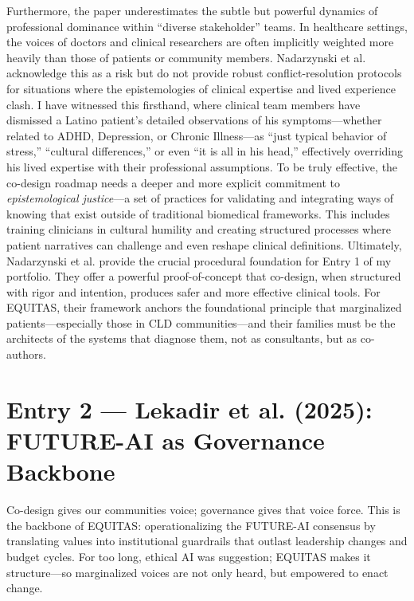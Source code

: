 \documentclass[11pt,twoside]{article}
\begin{document}
Furthermore, the paper underestimates the subtle but powerful dynamics of professional dominance within “diverse stakeholder” teams. In healthcare settings, the voices of doctors and clinical researchers are often implicitly weighted more heavily than those of patients or community members. Nadarzynski et al. acknowledge this as a risk but do not provide robust conflict-resolution protocols for situations where the epistemologies of clinical expertise and lived experience clash. I have witnessed this firsthand, where clinical team members have dismissed a Latino patient's detailed observations of his symptoms—whether related to ADHD, Depression, or Chronic Illness—as “just typical behavior of stress,” “cultural differences,” or even “it is all in his head,” effectively overriding his lived expertise with their professional assumptions. To be truly effective, the co-design roadmap needs a deeper and more explicit commitment to \textit{epistemological justice}—a set of practices for validating and integrating ways of knowing that exist outside of traditional biomedical frameworks. This includes training clinicians in cultural humility and creating structured processes where patient narratives can challenge and even reshape clinical definitions. Ultimately, Nadarzynski et al. provide the crucial procedural foundation for Entry 1 of my portfolio. They offer a powerful proof-of-concept that co-design, when structured with rigor and intention, produces safer and more effective clinical tools. For EQUITAS, their framework anchors the foundational principle that marginalized patients—especially those in CLD communities—and their families must be the architects of the systems that diagnose them, not as consultants, but as co-authors.

\newpage

\section*{Entry 2 --- Lekadir et al. (2025): FUTURE-AI as Governance Backbone}

{
\vspace{-0.3cm}
Co-design gives our communities voice; governance gives that voice force. This is the backbone of \textsc{EQUITAS}: operationalizing the FUTURE-AI consensus by translating values into institutional guardrails that outlast leadership changes and budget cycles. For too long, ethical AI was suggestion; EQUITAS makes it structure---so marginalized voices are not only heard, but empowered to enact change.
}
\end{document}

